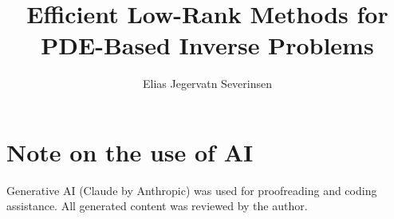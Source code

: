 \documentclass[a4paper,masters,en,listoffigures,listoftables]{NMBU}
\title{Efficient Low-Rank Methods for PDE-Based Inverse Problems}
\author{Elias Jegervatn Severinsen}
\begin{document}
\printnomenclature

\section*{Note on the use of AI}
Generative AI (Claude by Anthropic) was used for proofreading and coding assistance. All generated content was reviewed by the author.

\startthesis


\clearpage

\clearpage

\clearpage

\clearpage

\clearpage

\clearpage

\clearpage
{}
\clearpage

\appendices
\renewcommand{\theequation}{A\arabic{equation}}
\setcounter{equation}{0}

\end{document}
